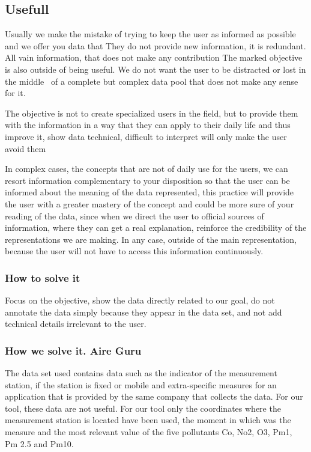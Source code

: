 \subsection{Usefull}
Usually we make the mistake of trying to keep the user as informed as possible and we offer you data that
They do not provide new information, it is redundant. All vain information, that does not make any contribution
The marked objective is also outside of being useful. We do not want the user to be distracted or lost in the middle
 of a complete but complex data pool that does not make any sense for it.

The objective is not to create specialized users in the field, but to provide them with the
information in a way that they can apply to their daily life and thus improve it, show data
technical, difficult to interpret will only make the user avoid them

In complex cases, the concepts that are not of daily use for the users, we can resort information
complementary to your disposition so that the user can be informed about the meaning of the data
represented, this practice will provide the user with a greater mastery of the concept and could be more
sure of your reading of the data, since when we direct the user to official sources of information, where they can
get a real explanation, reinforce the credibility of the representations we are making. In any case,
outside of the main representation, because the user will not have to access this information continuously.

\subsubsection{How to solve it} 
Focus on the objective, show the data directly related to our goal, do not annotate the data
simply because they appear in the data set, and not add technical details irrelevant to the user.

\subsubsection{How we solve it. Aire Guru} 

The data set used contains data such as the indicator of the measurement station, if the station is fixed or mobile
and extra-specific measures for an application that is provided by the same company that collects the data. For our
tool, these data are not useful.
For our tool only the coordinates where the measurement station is located have been used, the moment in
which was the measure and the most relevant value of the five pollutants Co, No2, O3, Pm1, Pm 2.5 and Pm10.


